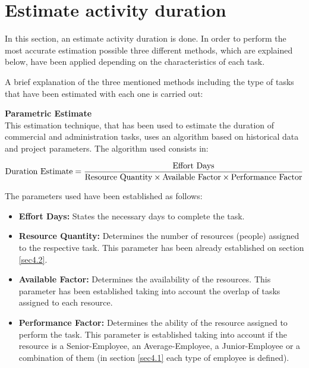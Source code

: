 \chapter{Estimate activity duration}

In this section, an estimate activity duration is done. In order to perform the most accurate estimation possible three different methods, which are explained below, have been applied depending on the characteristics of each task. 

A brief explanation of the three mentioned methods including the type of tasks that have been estimated with each one is carried out:

\textbf{Parametric Estimate} \\
This estimation technique, that has been used to estimate the duration of commercial and administration tasks, uses an algorithm based on historical data and project parameters. The algorithm used consists in: 

\begin{equation}
\centering
\notag \text{Duration Estimate}=\frac{\text{Effort Days}}{\text{Resource Quantity} \times \text{Available Factor} \times \text{Performance Factor}}
\end{equation} 

The parameters used have been established as follows:

\begin{itemize}
	
	\item \textbf{Effort Days:} States the necessary days to complete the task.
	
	\item \textbf{Resource Quantity:} Determines the number of resources (people) assigned to the respective task. This parameter has been already established on section \ref{sec4.2}.
	
	\item \textbf{Available Factor:} Determines the availability of the resources. This parameter has been established taking into account the overlap of tasks assigned to each resource.

	\item \textbf{Performance Factor:} Determines the ability of the resource assigned to perform the task. This parameter is established taking into account if the resource is a Senior-Employee, an Average-Employee, a Junior-Employee or a combination of them (in section \ref{sec4.1} each type of employee is defined).
	
\end{itemize}
\vspace{12mm}

